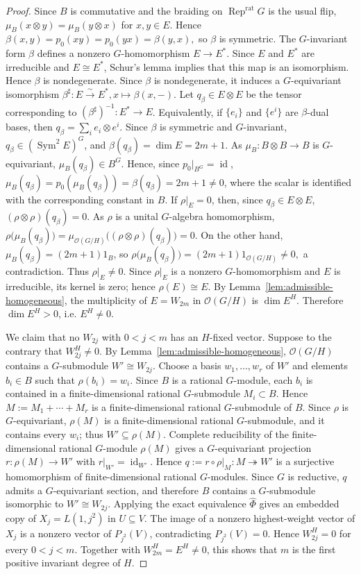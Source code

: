 \documentclass[10pt,a4paper]{amsart}
\numberwithin{equation}{section} \newtheorem{thm}{Theorem}[section] \newtheorem{lem}[thm]{Lemma} \newtheorem{ex}[thm]{Example} \newtheorem{prop}[thm]{Proposition} \newtheorem{cor}[thm]{Corollary} \newtheorem{defi}[thm]{Definition} \newtheorem{rmk}[thm]{Remark} \newtheorem{notation}[thm]{Notation}
\newcommand{\id}{\operatorname{id}}
\newcommand{\Rep}{\operatorname{Rep}}
\newcommand{\Sym}{\operatorname{Sym}}
\newcommand{\OO}{\mathcal O}
\begin{document}
\begin{proof}
Since $B$ is commutative and the braiding on $\Rep^{\mathrm{rat}}G$ is the usual flip, $\mu_B(x\otimes y)=\mu_B(y\otimes x)$ for $x,y\in E$. Hence $\beta(x,y)=p_0(xy)=p_0(yx)=\beta(y,x),$ so $\beta$ is symmetric. The $G$-invariant form $\beta$ defines a nonzero $G$-homomorphism $E\to E^*$. Since $E$ and $E^*$ are irreducible and $E\cong E^*$, Schur's lemma implies that this map is an isomorphism. Hence $\beta$ is nondegenerate. Since $\beta$ is nondegenerate, it induces a $G$-equivariant isomorphism \(\beta^\sharp:E\overset{\sim}{\longrightarrow}E^*, x\longmapsto\beta(x,-)\). Let $q_\beta\in E\otimes E$ be the tensor corresponding to $(\beta^\sharp)^{-1}:E^*\to E$. Equivalently, if $\{e_i\}$ and $\{e^i\}$ are $\beta$-dual bases, then $q_\beta=\sum_i e_i\otimes e^i.$ Since $\beta$ is symmetric and $G$-invariant, $q_\beta\in(\Sym^2E)^G$, and $\beta(q_\beta)=\dim E=2m+1.$ As $\mu_B:B\otimes B\to B$ is $G$-equivariant, $\mu_B(q_\beta)\in B^G$. Hence, since $p_0|_{B^G}=\id$, \(\mu_B(q_\beta)=p_0(\mu_B(q_\beta))=\beta(q_\beta)=2m+1\ne0\), where the scalar is identified with the corresponding constant in $B$. If $\rho|_E=0$, then, since $q_\beta\in E\otimes E$, $(\rho\otimes\rho)(q_\beta)=0.$ As $\rho$ is a unital $G$-algebra homomorphism, $\rho\bigl(\mu_B(q_\beta)\bigr) = \mu_{\OO(G/H)} \bigl((\rho\otimes\rho)(q_\beta)\bigr) =0.$ On the other hand, $\mu_B(q_\beta)=(2m+1)1_B$, so $\rho\bigl(\mu_B(q_\beta)\bigr) =(2m+1)1_{\OO(G/H)}\ne0,$ a contradiction. Thus $\rho|_E\ne0$. Since $\rho|_E$ is a nonzero $G$-homomorphism and $E$ is irreducible, its kernel is zero; hence $\rho(E)\cong E$. By Lemma~\ref{lem:admissible-homogeneous}, the multiplicity of $E=W_{2m}$ in $\OO(G/H)$ is $\dim E^H$. Therefore $\dim E^H>0$, i.e. $E^H\ne0$.

We claim that no $W_{2j}$ with $0<j<m$ has an $H$-fixed vector. Suppose to the contrary that $W_{2j}^H\ne0$. By Lemma~\ref{lem:admissible-homogeneous}, $\OO(G/H)$ contains a $G$-submodule $W'\cong W_{2j}$. Choose a basis $w_1,\ldots,w_r$ of $W'$ and elements $b_i\in B$ such that $\rho(b_i)=w_i$. Since $B$ is a rational $G$-module, each $b_i$ is contained in a finite-dimensional rational $G$-submodule $M_i\subset B$. Hence $M:=M_1+\cdots+M_r$ is a finite-dimensional rational $G$-submodule of $B$. Since $\rho$ is $G$-equivariant, $\rho(M)$ is a finite-dimensional rational $G$-submodule, and it contains every $w_i$; thus $W'\subseteq\rho(M)$. Complete reducibility of the finite-dimensional rational $G$-module $\rho(M)$ gives a $G$-equivariant projection $r:\rho(M)\to W'$ with $r|_{W'}=\id_{W'}$. Hence $q:=r\circ\rho|_M:M\twoheadrightarrow W'$ is a surjective homomorphism of finite-dimensional rational $G$-modules. Since $G$ is reductive, $q$ admits a $G$-equivariant section, and therefore $B$ contains a $G$-submodule isomorphic to $W'\cong W_{2j}$. Applying the exact equivalence $\widehat\Phi$ gives an embedded copy of $X_j=L(1,j^2)$ in $U\subseteq V$. The image of a nonzero highest-weight vector of $X_j$ is a nonzero vector of $P_{j^2}(V)$, contradicting $P_{j^2}(V)=0$. Hence $W_{2j}^H=0$ for every $0<j<m$. Together with $W_{2m}^H=E^H\ne0$, this shows that $m$ is the first positive invariant degree of $H$.


\end{proof}
\end{document}
